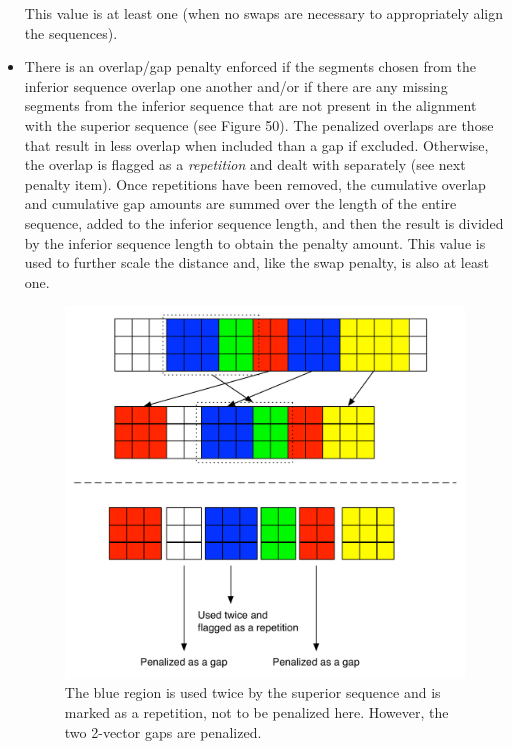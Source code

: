 \documentclass[12pt]{report} 	%
\numberwithin{figure}{chapter}
\numberwithin{table}{chapter}
\numberwithin{equation}{chapter}
\begin{document}
\begin{flushleft}
\begin{itemize}
\begin{figure}[h!]
\begin{center}
\end{center}
\vspace{6pt}
\end{figure}
This value is at least one (when no swaps are necessary to appropriately align the sequences). 
\item There is an overlap/gap penalty enforced if the segments chosen from the inferior 
\clearpage sequence overlap one another and/or if there are any missing segments from the inferior sequence that are not present in the alignment with the superior sequence (see Figure 50). The penalized overlaps are those that result in less overlap when included than a gap if excluded. Otherwise, the overlap is flagged as a \textit{repetition} and dealt with separately (see next penalty item). Once repetitions have been removed, the cumulative overlap and cumulative gap amounts are summed over the length of the entire sequence, added to the inferior sequence length, and then the result is divided by the inferior sequence length to obtain the penalty amount. This value is used to further scale the distance and, like the swap penalty, is also at least one.
\begin{figure}[h!]
\begin{center}
\includegraphics[scale=0.7]{Penalty_2}
\caption[Penalizing overlaps and gaps]{The blue region is used twice by the superior sequence and is marked as a repetition, not to be penalized here. However, the two 2-vector gaps are penalized.}

\end{center}
\end{figure}
\end{itemize}
\end{flushleft}
\end{document}
